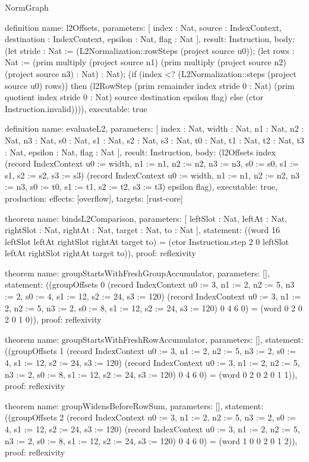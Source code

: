 \begin{lexlean}{NormGraph}
\begin{semanticmodule}
definition{
  name: l2Offsets,
  parameters: [
    index : Nat,
    source : IndexContext,
    destination : IndexContext,
    epsilon : Nat,
    flag : Nat
  ],
  result: Instruction,
  body: (let stride : Nat := (L2Normalization::rowSteps (project source u0)); (let rows : Nat := (prim multiply (project source n1) (prim multiply (project source n2) (project source n3) : Nat) : Nat); (if (index <? (L2Normalization::steps (project source u0) rows)) then (l2RowStep (prim remainder index stride 0 : Nat) (prim quotient index stride 0 : Nat) source destination epsilon flag) else (ctor Instruction.invalid)))),
  executable: true
}

definition{
  name: evaluateL2,
  parameters: [
    index : Nat,
    width : Nat,
    n1 : Nat,
    n2 : Nat,
    n3 : Nat,
    s0 : Nat,
    s1 : Nat,
    s2 : Nat,
    s3 : Nat,
    t0 : Nat,
    t1 : Nat,
    t2 : Nat,
    t3 : Nat,
    epsilon : Nat,
    flag : Nat
  ],
  result: Instruction,
  body: (l2Offsets index (record IndexContext {u0 := width, n1 := n1, n2 := n2, n3 := n3, s0 := s0, s1 := s1, s2 := s2, s3 := s3}) (record IndexContext {u0 := width, n1 := n1, n2 := n2, n3 := n3, s0 := t0, s1 := t1, s2 := t2, s3 := t3}) epsilon flag),
  executable: true,
  production: {effects: [overflow], targets: [rust-core]}
}

theorem{
  name: bindsL2Comparison,
  parameters: [
    leftSlot : Nat,
    leftAt : Nat,
    rightSlot : Nat,
    rightAt : Nat,
    target : Nat,
    to : Nat
  ],
  statement: ((word 16 leftSlot leftAt rightSlot rightAt target to) = (ctor Instruction.step 2 0 leftSlot leftAt rightSlot rightAt target to)),
  proof: reflexivity{}
}

theorem{
  name: groupStartsWithFreshGroupAccumulator,
  parameters: [],
  statement: ((groupOffsets 0 (record IndexContext {u0 := 3, n1 := 2, n2 := 5, n3 := 2, s0 := 4, s1 := 12, s2 := 24, s3 := 120}) (record IndexContext {u0 := 3, n1 := 2, n2 := 5, n3 := 2, s0 := 8, s1 := 12, s2 := 24, s3 := 120}) 0 4 6 0) = (word 0 2 0 2 0 1 0)),
  proof: reflexivity{}
}

theorem{
  name: groupStartsWithFreshRowAccumulator,
  parameters: [],
  statement: ((groupOffsets 1 (record IndexContext {u0 := 3, n1 := 2, n2 := 5, n3 := 2, s0 := 4, s1 := 12, s2 := 24, s3 := 120}) (record IndexContext {u0 := 3, n1 := 2, n2 := 5, n3 := 2, s0 := 8, s1 := 12, s2 := 24, s3 := 120}) 0 4 6 0) = (word 0 2 0 2 0 1 1)),
  proof: reflexivity{}
}

theorem{
  name: groupWidensBeforeRowSum,
  parameters: [],
  statement: ((groupOffsets 2 (record IndexContext {u0 := 3, n1 := 2, n2 := 5, n3 := 2, s0 := 4, s1 := 12, s2 := 24, s3 := 120}) (record IndexContext {u0 := 3, n1 := 2, n2 := 5, n3 := 2, s0 := 8, s1 := 12, s2 := 24, s3 := 120}) 0 4 6 0) = (word 1 0 0 2 0 1 2)),
  proof: reflexivity{}
}


\end{semanticmodule}
\end{lexlean}
